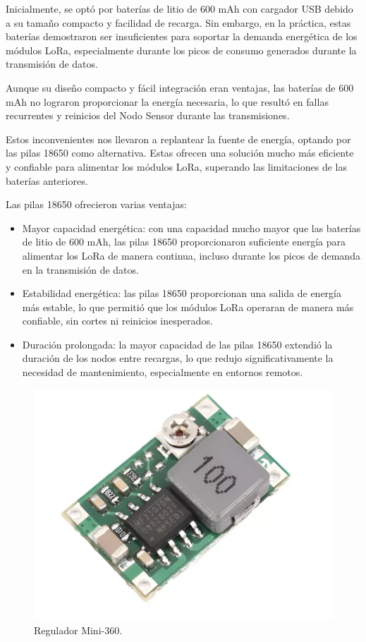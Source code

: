 Inicialmente, se optó por baterías de litio de 600 mAh con cargador USB debido a su tamaño compacto y facilidad de recarga. Sin embargo, en la práctica, estas baterías demostraron ser insuficientes para soportar la demanda energética de los módulos LoRa, especialmente durante los picos de consumo generados durante la transmisión de datos.

Aunque su diseño compacto y fácil integración eran ventajas, las baterías de 600 mAh no lograron proporcionar la energía necesaria, lo que resultó en fallas recurrentes y reinicios del Nodo Sensor durante las transmisiones.

Estos inconvenientes nos llevaron a replantear la fuente de energía, optando por las pilas 18650 como alternativa. Estas ofrecen una solución mucho más eficiente y confiable para alimentar los módulos LoRa, superando las limitaciones de las baterías anteriores. 

Las pilas 18650 ofrecieron varias ventajas:

\begin{itemize}
    \item Mayor capacidad energética: con una capacidad mucho mayor que las baterías de litio de 600 mAh, las pilas 18650 proporcionaron suficiente energía para alimentar los LoRa de manera continua, incluso durante los picos de demanda en la transmisión de datos.
    
    \item Estabilidad energética: las pilas 18650 proporcionan una salida de energía más estable, lo que permitió que los módulos LoRa operaran de manera más confiable, sin cortes ni reinicios inesperados.
    
    \item Duración prolongada: la mayor capacidad de las pilas 18650 extendió la duración de los nodos entre recargas, lo que redujo significativamente la necesidad de mantenimiento, especialmente en entornos remotos.
\end{itemize}

\begin{figure}[H]
	\centering
	\includegraphics[scale=0.6]{./Figures/Hardware/Alimentacion/mini360.png}
	\caption{Regulador Mini-360.}
	\label{fig:mini360}
\end{figure}

